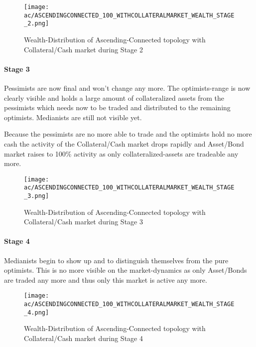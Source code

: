 \documentclass[Bachelorarbeit.tex]{subfiles}
\begin{document}
\begin{figure}[H]
	\centering
  \texttt{[image: ac/ASCENDINGCONNECTED\_100\_WITHCOLLATERALMARKET\_WEALTH\_STAGE\_2.png]}
  	\caption{Wealth-Distribution of Ascending-Connected topology with Collateral/Cash market during Stage 2}
	\label{fig:wealth_ASCENDINGCONNECTED_100_WITHCOLLATERALMARKET_WEALTH_STAGE_2}
\end{figure}

\paragraph{Stage 3}
Pessimists are now final and won't change any more. The optimists-range is now clearly visible and holds a large amount of collateralized assets from the pessimists which needs now to be traded and distributed to the remaining optimists. Medianists are still not visible yet.

\medskip

Because the pessimists are no more able to trade and the optimists hold no more cash the activity of the Collateral/Cash market drops rapidly and Asset/Bond market raises to 100\% activity as only collateralized-assets are tradeable any more.

\begin{figure}[H]
	\centering
  \texttt{[image: ac/ASCENDINGCONNECTED\_100\_WITHCOLLATERALMARKET\_WEALTH\_STAGE\_3.png]}
  	\caption{Wealth-Distribution of Ascending-Connected topology with Collateral/Cash market during Stage 3}
	\label{fig:wealth_ASCENDINGCONNECTED_100_WITHCOLLATERALMARKET_WEALTH_STAGE_3}
\end{figure}

\paragraph{Stage 4}
Medianists begin to show up and to distinguish themselves from the pure optimists. This is no more visible on the market-dynamics as only Asset/Bonds are traded any more and thus only this market is active any more.

\begin{figure}[H]
	\centering
  \texttt{[image: ac/ASCENDINGCONNECTED\_100\_WITHCOLLATERALMARKET\_WEALTH\_STAGE\_4.png]}
  	\caption{Wealth-Distribution of Ascending-Connected topology with Collateral/Cash market during Stage 4}
	\label{fig:wealth_ASCENDINGCONNECTED_100_WITHCOLLATERALMARKET_WEALTH_STAGE_4}
\end{figure}
\end{document}
